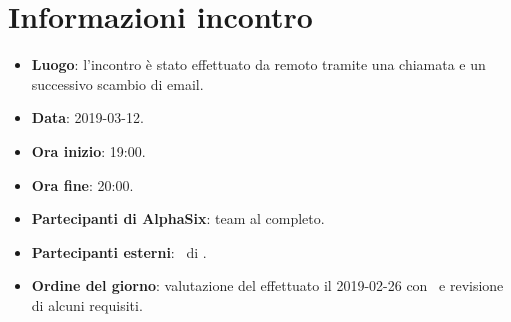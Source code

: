 \newcommand{\documento}{\VE}
\newcommand{\nomedocumentofisico}{VE\_2019-03-12.pdf}
\newcommand{\redazione}{\TG}
\newcommand{\verifica}{\CV}
\newcommand{\approvazione}{\SG}
\newcommand{\versione}{1.0.0}
\newcommand{\uso}{Esterno}
\newcommand{\destinateTo}{\TV, \\ & \RC, \\ & \II}
\newcommand{\datacreazione}{15 marzo 2019}
\newcommand{\datamodifica}{15 marzo 2019}
\newcommand{\stato}{Approvato}

\def\TABELLE{false}	%
\def\FIGURE{false} 	%






    

    
    
    \section{Informazioni incontro}
    	\begin{itemize}
    		\item \textbf{Luogo}: l'incontro è stato effettuato da remoto tramite una chiamata  e un successivo scambio di email.
    		\item \textbf{Data}: 2019-03-12.
    		\item \textbf{Ora inizio}: 19:00.
    		\item \textbf{Ora fine}: 20:00.
    		\item \textbf{Partecipanti di AlphaSix}: team al completo.
    		\item \textbf{Partecipanti esterni}: \DZ~di \II.
    		\item \textbf{Ordine del giorno}: valutazione del  effettuato il 2019-02-26 con \RC\ e revisione di alcuni requisiti.
    		
    	\end{itemize}
    
